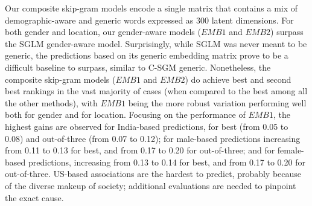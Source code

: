 \documentclass[11pt,letterpaper]{article}
\begin{document}
Our composite skip-gram models encode a single matrix that contains a mix of demographic-aware and generic words expressed as 300 latent dimensions. For both gender and location, our gender-aware models ($EMB1$ and $EMB2$) surpass the SGLM gender-aware model. Surprisingly, while SGLM was never meant to be generic, the predictions based on its generic embedding matrix prove to be a difficult baseline to surpass, similar to C-SGM generic. Nonetheless, the composite skip-gram models ($EMB1$ and $EMB2$) do achieve best and second best rankings in the vast majority of cases (when compared to the best among all the other methods), with $EMB1$ being the more robust variation performing well both for gender and for location. %
Focusing on the performance of $EMB1$, the highest gains are observed for India-based predictions, for best (from 0.05 to 0.08) and out-of-three (from 0.07 to 0.12); for male-based predictions increasing from 0.11 to 0.13 for best, and from 0.17 to 0.20 for out-of-three; and for female-based predictions, increasing from 0.13 to 0.14 for best, and from 0.17 to 0.20 for out-of-three.  US-based associations are the hardest to predict, probably because of the diverse makeup of society; additional evaluations are needed to pinpoint the exact cause. 
\end{document}
